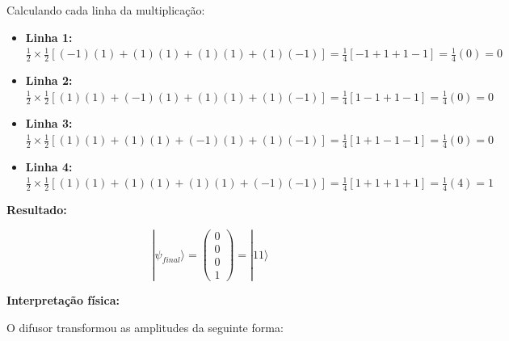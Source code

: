 \documentclass[
  brazilian,
]{report}
\begin{document}
Calculando cada linha da multiplicação:

\begin{itemize}
\item
  \textbf{Linha 1:}
  \(\frac{1}{2} \times \frac{1}{2}[(-1)(1) + (1)(1) + (1)(1) + (1)(-1)] = \frac{1}{4}[-1 + 1 + 1 - 1] = \frac{1}{4}(0) = 0\)
\item
  \textbf{Linha 2:}
  \(\frac{1}{2} \times \frac{1}{2}[(1)(1) + (-1)(1) + (1)(1) + (1)(-1)] = \frac{1}{4}[1 - 1 + 1 - 1] = \frac{1}{4}(0) = 0\)
\item
  \textbf{Linha 3:}
  \(\frac{1}{2} \times \frac{1}{2}[(1)(1) + (1)(1) + (-1)(1) + (1)(-1)] = \frac{1}{4}[1 + 1 - 1 - 1] = \frac{1}{4}(0) = 0\)
\item
  \textbf{Linha 4:}
  \(\frac{1}{2} \times \frac{1}{2}[(1)(1) + (1)(1) + (1)(1) + (-1)(-1)] = \frac{1}{4}[1 + 1 + 1 + 1] = \frac{1}{4}(4) = 1\)
\end{itemize}

\textbf{Resultado:}

\[|\psi_{final}\rangle = \begin{pmatrix}0\\0\\0\\1\end{pmatrix} = |11\rangle\]

\textbf{Interpretação física:}

O difusor transformou as amplitudes da seguinte forma:
\end{document}
